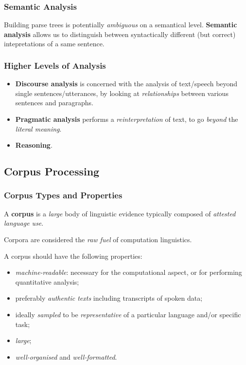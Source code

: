 \subsubsection{Semantic Analysis}
Building parse trees is potentially \emph{ambiguous} on a semantical level.
\textbf{Semantic analysis} allows us to distinguish between syntactically different (but correct) intepretations of a same sentence.

\subsubsection{Higher Levels of Analysis}
\begin{itemize}
	\item \textbf{Discourse analysis} is concerned with the analysis of text/speech beyond single sentences/utterances, by looking at \emph{relationships} between various sentences and paragraphs.
	\item \textbf{Pragmatic analysis} performs a \emph{reinterpretation} of text, to go \emph{beyond} the \emph{literal meaning}.
	\item \textbf{Reasoning}.
\end{itemize}

\subsection{Corpus Processing}
\subsubsection{Corpus Types and Properties}
\begin{mydef}[Corpus]
	A \textbf{corpus} is a \emph{large} body of linguistic evidence typically composed of \emph{attested language use}.
\end{mydef}
Corpora are considered the \emph{raw fuel} of computation linguistics.

A corpus should have the following properties:
\begin{itemize}
	\item \emph{machine-readable}: necessary for the computational aspect, or for performing quantitative analysis;
	\item preferably \emph{authentic texts} including transcripts of spoken data;
	\item ideally \emph{sampled} to be \emph{representative} of a particular language and/or specific task;
	\item \emph{large};
	\item \emph{well-organised} and \emph{well-formatted}.
\end{itemize}

